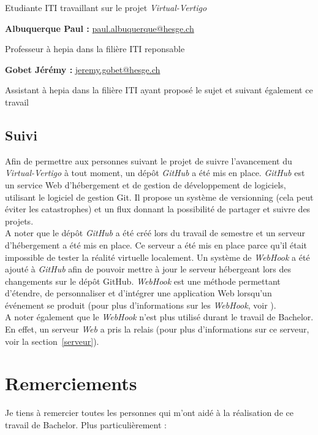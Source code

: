 Etudiante ITI travaillant sur le projet \textit{Virtual-Vertigo}

\textbf{Albuquerque Paul :} \href{paul.albuquerque@hesge.ch}{paul.albuquerque@hesge.ch}

Professeur à hepia dans la filière ITI reponsable

\textbf{Gobet Jérémy : }\href{jeremy.gobet@hesge.ch}{jeremy.gobet@hesge.ch}

Assistant à hepia dans la filière ITI ayant proposé le sujet et suivant également ce travail 

\subsection*{Suivi} 
Afin de permettre aux personnes suivant le projet de suivre l'avancement du \textit{Virtual-Vertigo} à tout moment, un dépôt \textit{GitHub} a été mis en place. \textit{GitHub} est un service Web d'hébergement et de gestion de développement de logiciels, utilisant le logiciel de gestion Git. Il propose un système de \textsf{versionning} (cela peut éviter les catastrophes) et un flux donnant la possibilité de partager et suivre des projets. \\
A noter que le dépôt \textit{GitHub} a été créé lors du travail de semestre et un serveur d'hébergement a été mis en place. Ce serveur a été mis en place parce qu'il était impossible de tester la réalité virtuelle localement. Un système de \textit{WebHook} a été ajouté à \textit{GitHub} afin de pouvoir mettre à jour le serveur hébergeant lors des changements sur le dépôt GitHub. \textit{WebHook} est une méthode permettant d'étendre, de personnaliser et d'intégrer une application Web lorsqu'un événement se produit (pour plus d'informations sur les \textit{WebHook}, voir \cite{webhook}).\\
A noter également que le \textit{WebHook} n'est plus utilisé durant le travail de Bachelor. En effet, un serveur \textit{Web} a pris la relais (pour plus d'informations sur ce serveur, voir la section~\ref{serveur}).

\newpage 

\section*{Remerciements}

Je tiens à remercier toutes les personnes qui m'ont aidé à la réalisation de ce travail de Bachelor. Plus particulièrement : \\

